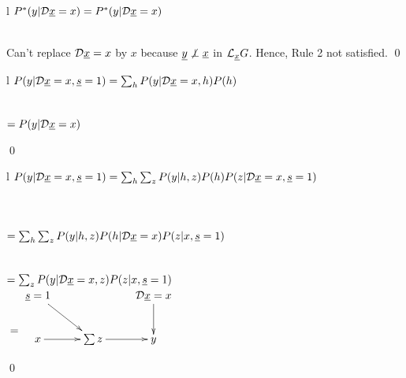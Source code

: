 \begin{claim}
\label{cl-decTransportNon}
\decTransportNon
\end{claim}
\proof
\begin{longtable}{l}
\color{red}
$P^*(y|\cald\rvx=x)=P^*(y|\cald\rvx=x)$
\\
\\
\xymatrix{\\=}
\end{longtable}
Can't replace $\cald\rvx=x$
by $x$ because
$\rvy\not\perp \rvx$ in
$\call_\rvx G$.
Hence, Rule 2 not satisfied.
\qed


\begin{claim}
\label{cl-decTransportTwo}
\decTransportTwo
\end{claim}
\proof
\begin{longtable}{l}
\color{red}
$P(y|\cald \rvx=x, \rvs=1)=
\sum_h P(y|\cald\rvx=x, h)P(h)$
\\
\\
\xymatrix{\\=}
\\
\color{red}
$=P(y|\cald\rvx=x)$
\\
\xymatrix{=}
\end{longtable}
\qed
\begin{claim}
\label{cl-decTransportThree}
\decTransportThree
\end{claim}
\proof

\begin{longtable}{l}
\color{red}
$P(y|\cald\rvx=x, \rvs=1)=
\sum_h
\sum_z P(y|h, z)P(h)
P(z|\cald\rvx=x, \rvs=1)$
\\
\\
\\
\\
\color{red}
$=\sum_h\sum_z P(y|h,z)P(h|\cald\rvx=x)
P(z|x, \rvs=1)$
\\
\\
\xymatrix{\\=}
\\
\color{red}
$=\sum_z P(y|\cald\rvx=x, z)P(z|x, \rvs=1)$
\\
$\xymatrix{\\=}\xymatrix{
\rvs=1\ar[rd]
&&\cald\rvx=x\ar[d]
\\
x\ar[r]
&\sum z\ar[r]
&y
}$
\end{longtable}
\qed

